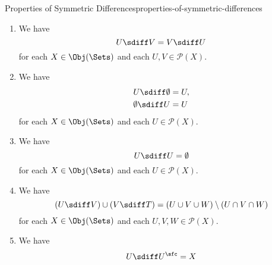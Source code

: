 \begin{proposition}{Properties of Symmetric Differences}{properties-of-symmetric-differences}
\begin{enumerate}
{\begin{webcompile}
                    \hspace{0.5em}\scalebox{1.5}{$\mathbin{\sdiff}$}\hspace{0.5em}%
                    .%
                \end{webcompile}%
                \par\vspace*{-0.375\baselineskip}
            }%
            \[
                (U\sdiff V)\sdiff W
                =
                U\sdiff(V\sdiff W)
            \]%
            for each $X\in\Obj(\Sets)$ and each $U,V,W\in\mathcal{P}(X)$.
        \item\label{properties-of-symmetric-differences-commutativity}We have
            \[
                U\sdiff V
                =
                V\sdiff U
            \]%
            for each $X\in\Obj(\Sets)$ and each $U,V\in\mathcal{P}(X)$.
        \item\label{properties-of-symmetric-differences-unitality}We have
            \begin{align*}
                U\sdiff\emptyset  &= U,\\
                \emptyset\sdiff U &= U
            \end{align*}
            for each $X\in\Obj(\Sets)$ and each $U\in\mathcal{P}(X)$.
        \item\label{properties-of-symmetric-differences-invertibility}We have
            \[
                U\sdiff U
                =
                \emptyset
            \]%
            for each $X\in\Obj(\Sets)$ and each $U\in\mathcal{P}(X)$.
        \item\label{properties-of-symmetric-differences-interaction-with-unions}We have
            \[
                (U\sdiff V)\cup(V\sdiff T)
                =
                (U\cup V\cup W)\setminus(U\cap V\cap W)
            \]%
            for each $X\in\Obj(\Sets)$ and each $U,V,W\in\mathcal{P}(X)$.
        \item\label{properties-of-symmetric-differences-interaction-with-complements-1}We have
            \[
                U\sdiff U^{\sfc}%
                =
                X%
            \]%

\end{enumerate}
\end{proposition}
